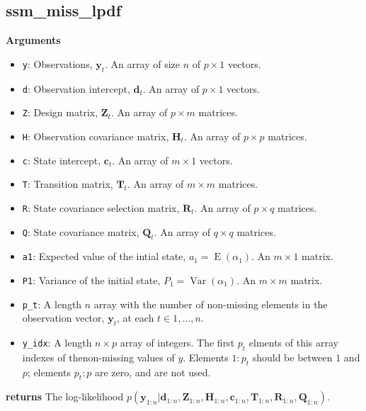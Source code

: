 \documentclass[]{book}
\providecommand{\tightlist}{%
  \setlength{\itemsep}{0pt}\setlength{\parskip}{0pt}}
\DeclareMathOperator{\E}{E}
\DeclareMathOperator{\Var}{Var}
\newcommand{\mat}[1]{\boldsymbol{#1}}
\renewcommand{\vec}[1]{\boldsymbol{#1}}
\begin{document}
\subsection{ssm\_miss\_lpdf}\label{ssm_miss_lpdf}

\textbf{Arguments}

\begin{itemize}
\tightlist
\item
  \texttt{y}: Observations, \(\vec{y}_t\). An array of size \(n\) of
  \(p \times 1\) vectors.
\item
  \texttt{d}: Observation intercept, \(\vec{d}_t\). An array of
  \(p \times 1\) vectors.
\item
  \texttt{Z}: Design matrix, \(\mat{Z}_t\). An array of \(p \times m\)
  matrices.
\item
  \texttt{H}: Observation covariance matrix, \(\mat{H}_t\). An array of
  \(p \times p\) matrices.
\item
  \texttt{c}: State intercept, \(\vec{c}_t\). An array of \(m \times 1\)
  vectors.
\item
  \texttt{T}: Transition matrix, \(\mat{T}_t\). An array of
  \(m \times m\) matrices.
\item
  \texttt{R}: State covariance selection matrix, \(\mat{R} _t\). An
  array of \(p \times q\) matrices.
\item
  \texttt{Q}: State covariance matrix, \(\mat{Q}_t\). An array of
  \(q \times q\) matrices.
\item
  \texttt{a1}: Expected value of the intial state,
  \(a_1 = \E(\alpha_1)\). An \(m \times 1\) matrix.
\item
  \texttt{P1}: Variance of the initial state, \(P_1 = \Var(\alpha_1)\).
  An \(m \times m\) matrix.
\item
  \texttt{p\_t}: A length \(n\) array with the number of non-missing
  elements in the observation vector, \(\vec{y}_t\), at each
  \(t \in 1, \dots, n\).
\item
  \texttt{y\_idx}: A length \(n \times p\) array of integers. The first
  \(p_t\) elments of this array indexes of thenon-missing values of
  \(y\). Elements \(1:p_t\) should be between \(1\) and \(p\); elements
  \(p_t:p\) are zero, and are not used.
\end{itemize}

\textbf{returns} The log-likelihood
\(p(\vec{y}_{1:n} | \vec{d}_{1:n}, \mat{Z}_{1:n}, \mat{H}_{1:n}, \vec{c}_{1:n}, \mat{T}_{1:n}, \mat{R}_{1:n}, \mat{Q}_{1:n})\).
\end{document}
